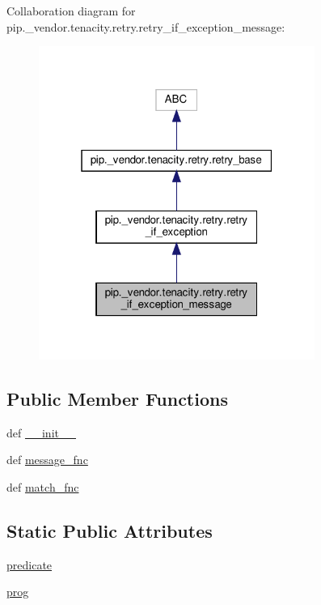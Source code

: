 Collaboration diagram for pip.\+\_\+vendor.\+tenacity.\+retry.\+retry\+\_\+if\+\_\+exception\+\_\+message\+:
\nopagebreak
\begin{figure}[H]
\begin{center}
\leavevmode
\includegraphics[width=256pt]{classpip_1_1__vendor_1_1tenacity_1_1retry_1_1retry__if__exception__message__coll__graph}
\end{center}
\end{figure}
\subsection*{Public Member Functions}
\begin{DoxyCompactItemize}
\item 
def \hyperlink{classpip_1_1__vendor_1_1tenacity_1_1retry_1_1retry__if__exception__message_a1f2844a790199db9f2961dcc03010db4}{\+\_\+\+\_\+init\+\_\+\+\_\+}
\item 
def \hyperlink{classpip_1_1__vendor_1_1tenacity_1_1retry_1_1retry__if__exception__message_a509fc09ea4f293d3aa56ab5841036a81}{message\+\_\+fnc}
\item 
def \hyperlink{classpip_1_1__vendor_1_1tenacity_1_1retry_1_1retry__if__exception__message_ac42ab19c41d14b41f4fd3800ec7c33d1}{match\+\_\+fnc}
\end{DoxyCompactItemize}
\subsection*{Static Public Attributes}
\begin{DoxyCompactItemize}
\item 
\hyperlink{classpip_1_1__vendor_1_1tenacity_1_1retry_1_1retry__if__exception__message_a12c2058af87f5ca3183fb7cc95f8b658}{predicate}
\item 
\hyperlink{classpip_1_1__vendor_1_1tenacity_1_1retry_1_1retry__if__exception__message_aa307d1a2709d58c48f5aff176ce20175}{prog}
\end{DoxyCompactItemize}
